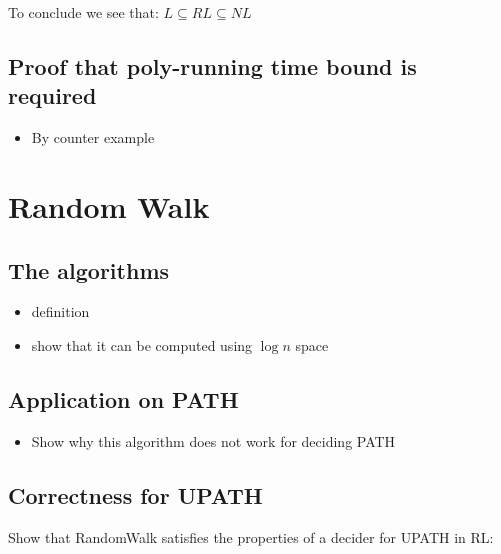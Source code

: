 To conclude we see that: $L \subseteq RL \subseteq NL$

\section{Proof that poly-running time bound is
required}\label{proof-that-poly-running-time-bound-is-required}

\begin{itemize}
\itemsep1pt\parskip0pt
\item
  By counter example
\end{itemize}

\chapter{Random Walk}\label{random-walk}

\section{The algorithms}\label{the-algorithms}

\begin{itemize}
\itemsep1pt\parskip0pt
\item
  definition
\item
  show that it can be computed using $\log n$ space
\end{itemize}

\section{Application on PATH}\label{application-on-path}

\begin{itemize}
\itemsep1pt\parskip0pt
\item
  Show why this algorithm does not work for deciding PATH
\end{itemize}

\section{Correctness for UPATH}\label{correctness-for-upath}

Show that RandomWalk satisfies the properties of a decider for UPATH in
RL:


